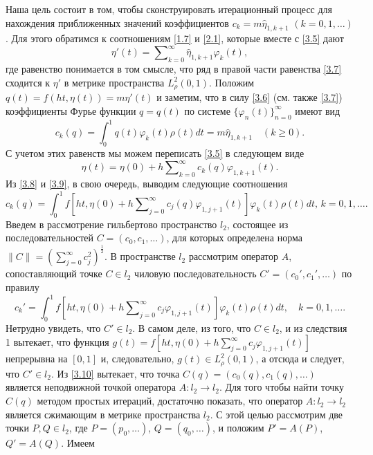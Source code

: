 Наша цель состоит в том, чтобы сконструировать итерационный процесс для нахождения приближенных значений коэффициентов $c_k=m\hat \eta_{1,k+1}$ $(k=0,1,\ldots)$. Для этого обратимся к соотношениям \eqref{1.7} и \eqref{2.1}, которые вместе с \eqref{3.5} дают
\begin{equation}\label{3.7}
\eta'(t)=  \sum\nolimits_{k=0}^\infty \hat \eta_{1,k+1}\varphi_k(t),
\end{equation}
где равенство понимается в том смысле, что ряд в правой части равенства \eqref{3.7} сходится к $\eta'$ в метрике пространства $L^2_{\rho}(0,1)$. Положим $q(t)=f(ht,\eta(t))=m\eta'(t)$ и заметим, что в силу  \eqref{3.6} (см. также \eqref{3.7}) коэффициенты Фурье функции $q=q(t)$ по системе  $\{\varphi_{n}(t)\}_{n=0}^\infty$ имеют вид
\begin{equation}\label{3.8}
 c_k(q)=\int_{0}^1 q(t)\varphi_{k}(t)\rho(t)dt=m\hat \eta_{1,k+1} \quad (k\ge0).
\end{equation}
С учетом этих равенств мы можем переписать \eqref{3.5} в следующем виде
\begin{equation}\label{3.9}
\eta(t)= \eta(0)+ h\sum\nolimits_{k=0}^\infty c_k(q){\varphi}_{1,k+1}(t).
\end{equation}
Из  \eqref{3.8} и \eqref{3.9}, в свою очередь, выводим следующие соотношения
\begin{equation}\label{3.10}
c_k(q)=\int_{0}^1f\left[ht,\eta(0)+ h\sum\nolimits_{j=0}^\infty c_j(q)\varphi_{1,j+1}(t)\right]\varphi_k(t)\rho(t) dt,\, k=0,1,\ldots.
\end{equation}
Введем в рассмотрение гильбертово пространство $l_2$, состоящее из последовательностей $C=(c_0,c_1,\ldots)$, для которых определена норма
$\|C\|=\left(\sum_{j=0}^\infty c_j^2\right)^\frac12$.  В пространстве $l_2$ рассмотрим оператор $A$, сопоставляющий точке $C\in l_2$ чиловую последовательность $C'=(c_0',c_1',\ldots)$ по правилу
\begin{equation}\label{3.11}
c_k'=\int_{0}^1f\left[ht,\eta(0)+ h\sum\nolimits_{j=0}^\infty c_j
\varphi_{1,j+1}(t)\right]\varphi_k(t)\rho(t) dt,\quad k=0,1,\ldots.
\end{equation}
Нетрудно увидеть, что $C'\in l_2$. В самом деле, из того, что $C\in l_2$, и из следствия 1 вытекает, что функция $g(t)=f[ht,\eta(0)+ h\sum\nolimits_{j=0}^\infty c_j
\varphi_{1,j+1}(t)]$ непрерывна на $[0,1]$ и, следовательно, $g(t)\in L^2_\rho(0,1)$, а отсюда и следует, что $C'\in l_2$. Из  \eqref{3.10} вытекает, что точка $C(q)=(c_0(q),c_1(q),\ldots)$ является неподвижной точкой оператора $A:l_2\to l_2$. Для того чтобы найти точку $C(q)$ методом простых итераций, достаточно показать, что оператор $A:l_2\to l_2$ является сжимающим в метрике пространства $l_2$. С этой целью рассмотрим две точки $P,Q\in l_2$, где $P=(p_0,\ldots)$, $Q=(q_0,\ldots)$, и положим $P'=A(P)$, $Q'=A(Q)$. Имеем
